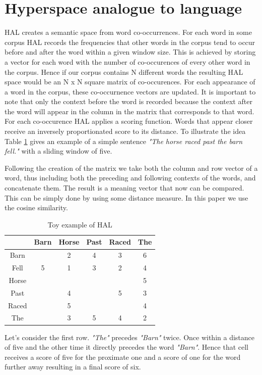 \documentclass[12pt]{report}
\begin{document}
\section{Hyperspace analogue to language}

HAL creates a semantic space from word co-occurrences. For each word in some corpus HAL records the frequencies that other words in the corpus tend to occur before and after the word within a given window size. This is achieved  by storing a vector for each word with the number of co-occurences of every other word in the corpus. Hence if our corpus contains N different words the resulting HAL space would be an N x N square matrix of co-occurences. For each appearance of a word in the corpus, these co-occurnence vectors are updated. It is important to note that only the context before the word is recorded because the context after the word will appear in the column in the matrix that corresponds to that word. For each co-occurence HAL applies a scoring function. Words that appear closer receive an inversely proportionated score to its distance. To illustrate the idea Table \ref{tab:halex} gives an example of a simple sentence \emph {"The horse raced past the barn fell."} with a sliding window of five. 

Following the creation of the matrix we take both the column and row vector of a word, thus including both the preceding and following contexts of the words, and concatenate them. The result is a meaning vector that now can be compared. This can be simply done by using some distance measure. In this paper we use the cosine similarity. 

\begin{table}[h]
\centering
\begin{tabular}{ c c c c c c} \toprule
  & Barn & Horse &  Past & Raced & The \\ 
  \hline
 Barn &  & 2 &  4 & 3 & 6 \\ 
 Fell & 5 & 1 &  3 & 2 & 4 \\ 
 Horse &  &  &   &  & 5 \\ 
 Past &  & 4 &   & 5 & 3 \\ 
 Raced &  & 5 &   &  & 4 \\ 
 The &  & 3 &  5 & 4 & 2 \\ 
   \bottomrule
\end{tabular}
\caption{Toy example of HAL}
\label{tab:halex}
\end{table}

Let's consider the first row.  \emph{"The"} precedes \emph{"Barn"} twice. Once within a distance of five and the other time it directly precedes the word  \emph{"Barn"}. Hence that cell receives a score of five for the proximate one and a score of one for the word further away resulting in a final score of six. 
\end{document}
